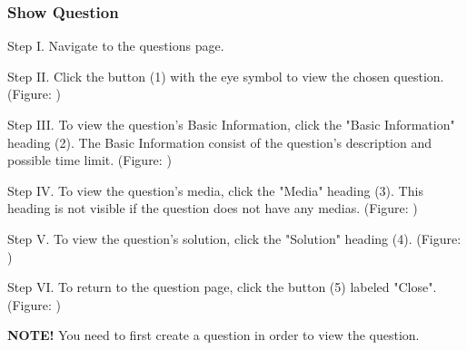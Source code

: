 \subsubsection{Show Question}

\begin{figure}[H]
	\begin{subfigure}{0.60\linewidth}
		
	\end{subfigure}
	\begin{subfigure}{0.60\linewidth}
		
	\end{subfigure}
\end{figure}

\begin{userManualItemlist}
	\item[Step I.] Navigate to the questions page.
	\item[Step II.] Click the button (1) with the eye symbol to view the chosen question. (Figure: )
	\item[Step III.] To view the question's Basic Information, click the "Basic Information" heading (2). The Basic Information consist of the question's description and possible time limit. (Figure: )
	\item[Step IV.] To view the question's media, click the "Media" heading (3). This heading is not visible if the question does not have any medias. (Figure: )
	\item[Step V.] To view the question's solution, click the "Solution" heading (4). (Figure: )
	\item[Step VI.] To return to the question page, click the button (5) labeled "Close". (Figure: ) 
\end{userManualItemlist}
\textbf{NOTE!} You need to first create a question in order to view the question.